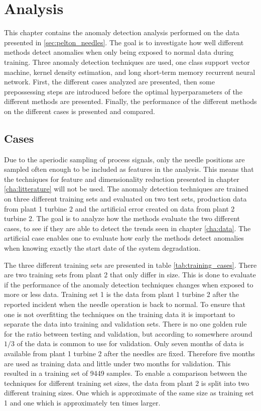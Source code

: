 \chapter{Analysis}\label{cha:analysis}
This chapter contains the anomaly detection analysis performed on the data presented in \ref{sec:pelton_needles}. The goal is to investigate how well different methods detect anomalies when only being exposed to normal data during training. Three anomaly detection techniques are used, one class support vector machine, kernel density estimation, and long short-term memory recurrent neural network. First, the different cases analyzed are presented, then some prepossessing steps are introduced before the optimal hyperparameters of the different methods are presented. Finally, the performance of the different methods on the different cases is presented and compared.

    \section{Cases}
        Due to the aperiodic sampling of process signals, only the needle positions are sampled often enough to be included as features in the analysis. This means that the techniques for feature and dimensionality reduction presented in chapter \ref{cha:litterature} will not be used. The anomaly detection techniques are trained on three different training sets and evaluated on two test sets, production data from plant 1 turbine 2 and the artificial error created on data from plant 2 turbine 2. The goal is to analyze how the methods evaluate the two different cases, to see if they are able to detect the trends seen in chapter \ref{cha:data}. The artificial case enables one to evaluate how early the methods detect anomalies when knowing exactly the start date of the system degradation. 
        
        The three different training sets are presented in table \ref{tab:training_cases}. There are two training sets from plant 2 that only differ in size. This is done to evaluate if the performance of the anomaly detection techniques changes when exposed to more or less data. Training set 1 is the data from plant 1 turbine 2 after the reported incident when the needle operation is back to normal. To ensure that one is not overfitting the techniques on the training data it is important to separate the data into training and validation sets. There is no one golden rule for the ratio between testing and validation, but according to \cite{Kohavi1995} somewhere around $1/3$ of the data is common to use for validation. Only seven months of data is available from plant 1 turbine 2 after the needles are fixed. Therefore five months are used as training data and little under two months for validation. This resulted in a training set of 9449 samples. To enable a comparison between the techniques for different training set sizes, the data from plant 2 is split into two different training sizes. One which is approximate of the same size as training set 1 and one which is approximately ten times larger. 

